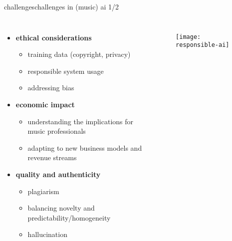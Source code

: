 \begin{frame}{challenges}{challenges in (music) ai 1/2}
    \vspace{-5mm}
    \begin{columns}
        \begin{itemize}
            \item \textbf{ethical considerations}
                \begin{itemize}
                    \item training data (copyright, privacy)
                    \item responsible system usage
                    \item addressing bias
                \end{itemize}
            \smallskip
            \item \textbf{economic impact}
                \begin{itemize}
                    \item understanding the implications for music professionals
                    \item adapting to new business models and revenue streams
                \end{itemize}
            \smallskip
            \item   \textbf{quality and authenticity}
                \begin{itemize}
                    \item plagiarism
                    \item balancing novelty and predictability/homogeneity
                    \item hallucination
                \end{itemize}
            \smallskip
        \end{itemize}
        \vspace{20mm}
        \begin{figure}%
            \texttt{[image: responsible-ai]}%
        \end{figure}
    \end{columns}
\end{frame}

